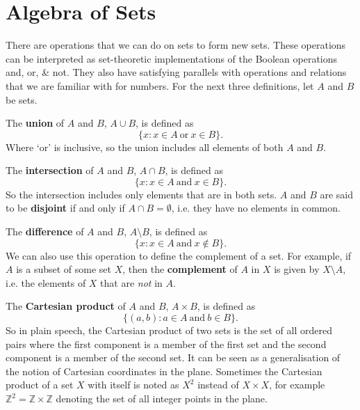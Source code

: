 \documentclass[../real_analysis.tex]{subfiles}
\begin{document}
    \section{Algebra of Sets}\label{sec:algebra-of-sets}
        There are operations that we can do on sets to form new sets. These operations can be interpreted as set-theoretic implementations of the Boolean operations and, or, \& not. They also have satisfying parallels with operations and relations that we are familiar with for numbers. For the next three definitions, let $A$ and $B$ be sets.
        \begin{definition}
            The \textbf{union} of $A$ and $B$, $A \cup B$, is defined as
            \[\{x: x \in A\ \text{or}\ x \in B\}.\]
            Where `or' is inclusive, so the union includes all elements of both $A$ and $B$.
        \end{definition}
        \begin{definition}
            The \textbf{intersection} of $A$ and $B$, $A \cap B$, is defined as
            \[\{x: x \in A\ \text{and}\ x \in B\}.\]
            So the intersection includes only elements that are in both sets. $A$ and $B$ are said to be \textbf{disjoint} if and only if $A \cap B = \emptyset$, i.e. they have no elements in common.
        \end{definition}
        \begin{definition}
            The \textbf{difference} of $A$ and $B$, $A \setminus B$, is defined as
            \[\{x: x \in A\ \text{and}\ x \notin B\}.\]
            We can also use this operation to define the complement of a set. For example, if $A$ is a subset of some set $X$, then the \textbf{complement} of $A$ in $X$ is given by $X \setminus A$, i.e. the elements of $X$ that are \textit{not} in $A$.
        \end{definition}
        \begin{definition}
            The \textbf{Cartesian product} of $A$ and $B$, $A\times B$, is defined as
            \[\{(a, b): a \in A\ \text{and}\ b \in B\}.\]
            So in plain speech, the Cartesian product of two sets is the set of all ordered pairs where the first component is a member of the first set and the second component is a member of the second set. It can be seen as a generalisation of the notion of Cartesian coordinates in the plane. Sometimes the Cartesian product of a set $X$ with itself is noted as $X^2$ instead of $X \times X$, for example $\mathbb{Z}^2 = \mathbb{Z} \times \mathbb{Z}$ denoting the set of all integer points in the plane.
        \end{definition}
\end{document}
